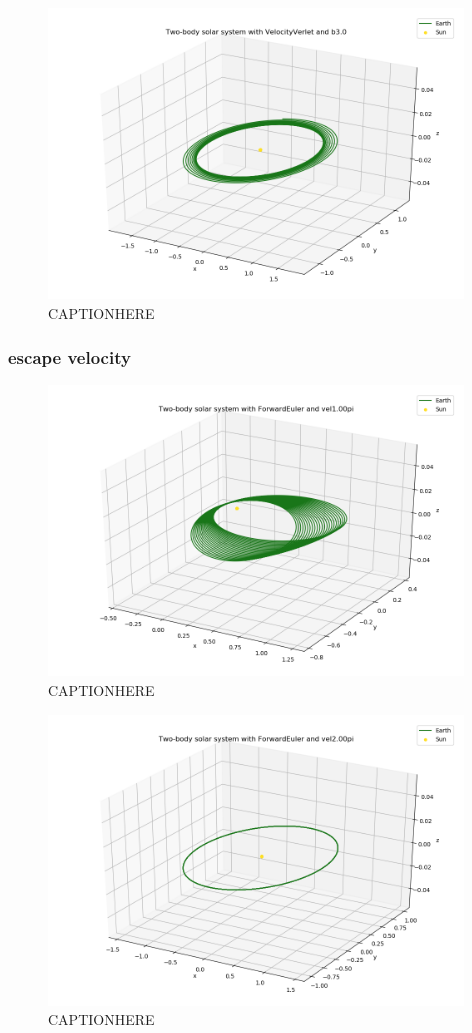 \documentclass{article}
\begin{document}
    \begin{figure}[H]
        \centering
        \includegraphics[width = 11cm]{img/plot3D_S_E_V_b30.png}
        \caption{CAPTIONHERE}
        \label{fig:plot3D_S_E_V_b30}
    \end{figure}

\subsubsection{escape velocity}

    \begin{figure}[H]
        \centering
        \includegraphics[width = 11cm]{img/plot3D_S_E_F_vel100pi.png}
        \caption{CAPTIONHERE}
        \label{fig:plot3D_S_E_F_vel100pi}
    \end{figure}

    \begin{figure}[H]
        \centering
        \includegraphics[width = 11cm]{img/plot3D_S_E_F_vel200pi.png}
        \caption{CAPTIONHERE}
        \label{fig:plot3D_S_E_F_vel200pi}
    \end{figure}
\end{document}

